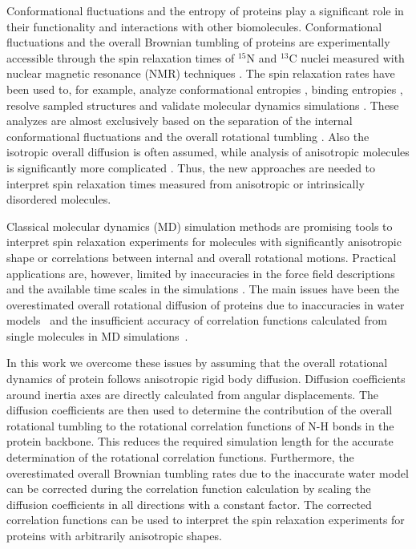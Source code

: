 \documentclass[journal=jpcbfk,manuscript=article]{achemso}
\begin{document}
Conformational fluctuations and the entropy of proteins
play a significant role in their functionality
and interactions with other biomolecules.
Conformational fluctuations and the overall Brownian tumbling of proteins
are experimentally accessible through the 
spin relaxation times of $^{15}$N and $^{13}$C nuclei measured
with nuclear magnetic resonance (NMR) 
techniques \cite{jarymowycz06,korzhnev01,mulder01,eisenmesser05,bedem15,lewandowski15,lamley15}. 
The spin relaxation rates have been used to, for example, analyze
conformational entropies \cite{yang96,kasinath13,allner15,jarymowycz06,solomentsev18}, binding entropies \cite{akke93,jarymowycz06},
resolve sampled structures \cite{mulder01,eisenmesser05,bedem15,medina14}
and validate molecular dynamics simulations \cite{best04,showalter07a,showalter07b,maragakis08,trbovic08,debiec16,hoffmann18,debiec18}.
These analyzes are almost exclusively based on the
separation of the internal conformational fluctuations 
and the overall rotational tumbling \cite{wennerstrom79,Lipari82}.
Also the isotropic overall diffusion is often assumed, while
analysis of anisotropic molecules is significantly more
complicated \cite{woessner62,shimizu62,jarymowycz06,korzhnev01,luginbuhl97,hall04}.
Thus, the new approaches are needed to interpret spin relaxation times
measured from anisotropic or intrinsically disordered molecules.

Classical molecular dynamics (MD) simulation methods are
promising tools to interpret spin relaxation experiments
for molecules with significantly anisotropic shape or correlations between
internal and overall rotational motions. Practical applications
are, however, limited by inaccuracies in the force field descriptions
and the available time scales in the simulations \cite{prompers02,maragakis08,trbovic08,wong08,anderson12,salvi16,debiec16}.
The main issues have been the overestimated overall rotational diffusion of proteins
due to inaccuracies in water models~\cite{wong08,takemura12,debiec16} and the
insufficient accuracy of correlation functions calculated from
single molecules in MD simulations~\cite{lu06,anderson12}.

In this work we overcome these issues by assuming that the overall
rotational dynamics of protein follows anisotropic rigid body diffusion.
Diffusion coefficients around inertia axes are 
directly calculated from angular displacements.
The diffusion coefficients are then used to determine the
contribution of the overall rotational tumbling to the 
rotational correlation functions of N-H bonds in the protein backbone.
This reduces the required simulation length for the accurate determination
of the rotational correlation functions. Furthermore, the overestimated
overall Brownian tumbling rates due to the inaccurate water model
can be corrected during the correlation function calculation by scaling
the diffusion coefficients in all directions with a constant factor.
The corrected correlation functions can be used to interpret the spin relaxation
experiments for proteins with arbitrarily anisotropic shapes.
\end{document}
